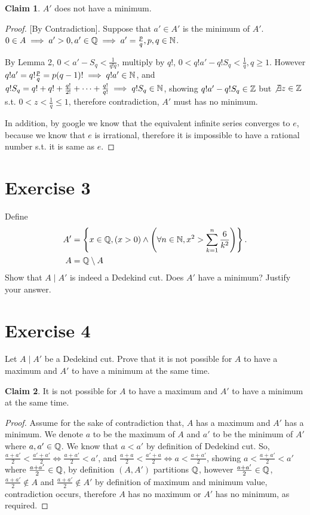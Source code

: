 \documentclass{homework}
\newcommand{\Q}{\bb{Q}} %
\newcommand{\Z}{\bb{Z}} %
\newcommand{\N}{\bb{N}} %
\newcommand{\?}{\stackrel{?}{=}}
\theoremstyle{definition}
\newtheorem*{claim}{Claim}
\begin{document}
\begin{claim}
    $A'$ does not have a minimum.
\end{claim}
\begin{proof}{[By Contradiction]. }
     Suppose that $a'\in A'$ is the minimum of $A'$. $0\in A\implies a'>0, a'\in\Q\implies a'=\frac{p}q, p,q\in\N$. 

     By Lemma 2, $0 < a' - S_q < \frac{1}{q!q}$, multiply by $q!$, $0<q!a'-q!S_q<\frac{1}{q}, q\geq1$. However $q!a'=q!\frac{p}{q}=p(q-1)!\implies q!a'\in\N$, and $q!S_q=q!+q!+\frac{q!}{2!}+\cdots+\frac{q!}{q!}\implies q!S_q\in\N$, showing $q!a'-q!S_q\in\Z$ but $\not\exists z\in\Z$ s.t. \(0<z<\frac{1}{q}\leq1\), therefore contradiction, $A'$ must has no minimum. 

     In addition, by google we know that the equivalent infinite series converges to $e$, because we know that $e$ is irrational, therefore it is impossible to have a rational number s.t. it is same as $e$. 
\end{proof}


\newpage
\section*{Exercise 3}
Define \begin{alignat*}{1}
    A'&=\left\{x\in\Q,(x>0)\land\left(\forall n\in\N, x^2>\sum_{k=1}^n\frac{6}{k^2}\right)\right\}.\\
    A&=\Q\setminus A
\end{alignat*} 
\question[1] Show that $A\mid A'$ is indeed a Dedekind cut.
\question[2] Does $A'$ have a minimum? Justify your answer.




\newpage
\section*{Exercise 4}
Let $A\mid A'$ be a Dedekind cut.
\question[1] Prove that it is not possible for $A$ to have a maximum and $A'$ to have a minimum at the same time.
\begin{claim}
    It is not possible for $A$ to have a maximum and $A'$ to have a minimum at the same time.
\end{claim}
\begin{proof}
    Assume for the sake of contradiction that, $A$ has a maximum and $A'$ has a minimum. We denote $a$ to be the maximum of $A$ and $a'$ to be the minimum of $A'$ where $a,a'\in\Q$. We know that $a<a'$ by definition of Dedekind cut. So, $\frac{a+a'}{2}<\frac{a'+a'}{2}\iff \frac{a+a'}{2}<a'$, and $\frac{a+a}{2}<\frac{a'+a}{2}\iff a<\frac{a+a'}{2}$, showing $a<\frac{a+a'}{2}<a'$ where $\frac{a+a'}{2}\in\Q$, by definition $(A,A')$ partitions $\Q$, however $\frac{a+a'}{2}\in\Q$, $\frac{a+a'}{2}\notin A$ and $\frac{a+a'}{2}\notin A'$ by definition of maximum and minimum value, contradiction occurs, therefore $A$ has no maximum or $A'$ has no minimum, as required.  
\end{proof}
\end{document}
